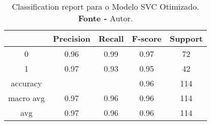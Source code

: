 % 
\begin{table}[H]
    \centering
    \begin{tabular}{@{}ccccc@{}}
    \toprule
     & \textbf{Precision} & \textbf{Recall} &\textbf{F-score} & \textbf{Support} \\ \midrule 
    0 & 0.96 & 0.99 & 0.97 & 72 \\ 
    1 & 0.97 & 0.93 & 0.95 & 42 \\ 
    accuracy &  &  & 0.96 & 114 \\ 
    macro avg & 0.97 & 0.96 & 0.96 & 114 \\ 
    avg & 0.97 & 0.96 & 0.96 & 114 \\ \bottomrule 
    \end{tabular}
    \caption{Classification report para o Modelo SVC Otimizado. \\ \textbf{Fonte -} Autor.}
    \label{tab: classification-report-Modelo SVC Otimizado}
\end{table}